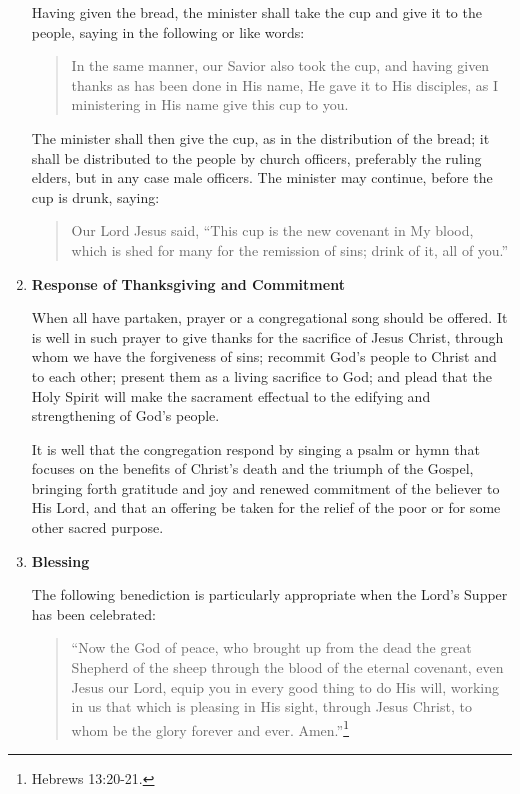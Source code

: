 \documentclass[
]{book}
\begin{document}
\begin{enumerate}
  Having given the bread, the minister shall take the cup and give it to the people, saying in the following or like words:

  \begin{quote}
  In the same manner, our Savior also took the cup, and having given thanks as has been done in His name, He gave it to His disciples, as I ministering in His name give this cup to you.
  \end{quote}

  The minister shall then give the cup, as in the distribution of the bread; it shall be distributed to the people by church officers, preferably the ruling elders, but in any case male officers. The minister may continue, before the cup is drunk, saying:

  \begin{quote}
  Our Lord Jesus said, ``This cup is the new covenant in My blood, which is shed for many for the remission of sins; drink of it, all of you.''
  \end{quote}
\item
  \textbf{Response of Thanksgiving and Commitment}

  When all have partaken, prayer or a congregational song should be offered. It is well in such prayer to give thanks for the sacrifice of Jesus Christ, through whom we have the forgiveness of sins; recommit God's people to Christ and to each other; present them as a living sacrifice to God; and plead that the Holy Spirit will make the sacrament effectual to the edifying and strengthening of God's people.

  It is well that the congregation respond by singing a psalm or hymn that focuses on the benefits of Christ's death and the triumph of the Gospel, bringing forth gratitude and joy and renewed commitment of the believer to His Lord, and that an offering be taken for the relief of the poor or for some other sacred purpose.
\item
  \textbf{Blessing}

  The following benediction is particularly appropriate when the Lord's Supper has been celebrated:

  \begin{quote}
  ``Now the God of peace, who brought up from the dead the great Shepherd of the sheep through the blood of the eternal covenant, even Jesus our Lord, equip you in every good thing to do His will, working in us that which is pleasing in His sight, through Jesus Christ, to whom be the glory forever and ever. Amen.''\footnote{Hebrews 13:20-21.}
  \end{quote}
\end{enumerate}
\end{document}
